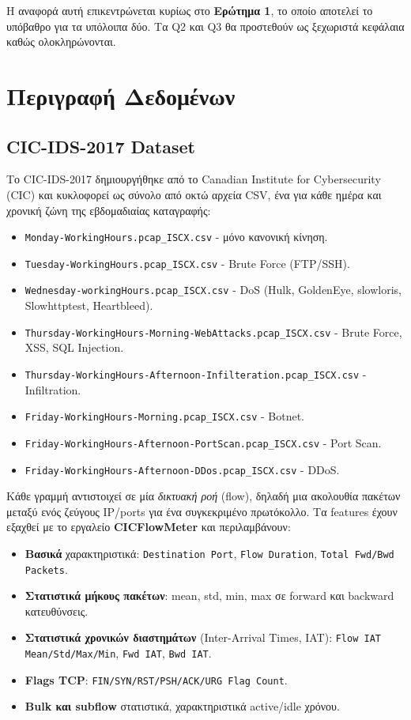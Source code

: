\documentclass[12pt,a4paper,twoside]{book}
\begin{document}
Η αναφορά αυτή επικεντρώνεται κυρίως στο \textbf{Ερώτημα 1}, το οποίο
αποτελεί το υπόβαθρο για τα υπόλοιπα δύο. Τα Q2 και Q3 θα προστεθούν ως
ξεχωριστά κεφάλαια καθώς ολοκληρώνονται.

\section{Περιγραφή Δεδομένων}

\subsection{CIC-IDS-2017 Dataset}

Το CIC-IDS-2017 δημιουργήθηκε από το Canadian Institute for Cybersecurity
(CIC) και κυκλοφορεί ως σύνολο από οκτώ αρχεία CSV, ένα για κάθε ημέρα και
χρονική ζώνη της εβδομαδιαίας καταγραφής:

\begin{itemize}
    \item \texttt{Monday-WorkingHours.pcap\_ISCX.csv} - μόνο κανονική κίνηση.
    \item \texttt{Tuesday-WorkingHours.pcap\_ISCX.csv} - Brute Force (FTP/SSH).
    \item \texttt{Wednesday-workingHours.pcap\_ISCX.csv} - DoS (Hulk, GoldenEye,
    slowloris, Slowhttptest, Heartbleed).
    \item \texttt{Thursday-WorkingHours-Morning-WebAttacks.pcap\_ISCX.csv} -
    Brute Force, XSS, SQL Injection.
    \item \texttt{Thursday-WorkingHours-Afternoon-Infilteration.pcap\_ISCX.csv} -
    Infiltration.
    \item \texttt{Friday-WorkingHours-Morning.pcap\_ISCX.csv} - Botnet.
    \item \texttt{Friday-WorkingHours-Afternoon-PortScan.pcap\_ISCX.csv} -
    Port Scan.
    \item \texttt{Friday-WorkingHours-Afternoon-DDos.pcap\_ISCX.csv} - DDoS.
\end{itemize}

Κάθε γραμμή αντιστοιχεί σε μία \textit{δικτυακή ροή} (flow), δηλαδή μια ακολουθία
πακέτων μεταξύ ενός ζεύγους IP/ports για ένα συγκεκριμένο πρωτόκολλο.
Τα features έχουν εξαχθεί με το εργαλείο \textbf{CICFlowMeter} και
περιλαμβάνουν:

\begin{itemize}
    \item \textbf{Βασικά} χαρακτηριστικά: \texttt{Destination Port},
    \texttt{Flow Duration}, \texttt{Total Fwd/Bwd Packets}.
    \item \textbf{Στατιστικά μήκους πακέτων}: mean, std, min, max σε forward
    και backward κατευθύνσεις.
    \item \textbf{Στατιστικά χρονικών διαστημάτων} (Inter-Arrival Times, IAT):
    \texttt{Flow IAT Mean/Std/Max/Min}, \texttt{Fwd IAT}, \texttt{Bwd IAT}.
    \item \textbf{Flags TCP}: \texttt{FIN/SYN/RST/PSH/ACK/URG Flag Count}.
    \item \textbf{Bulk και subflow} στατιστικά, χαρακτηριστικά
    active/idle χρόνου.
\end{itemize}
\end{document}
